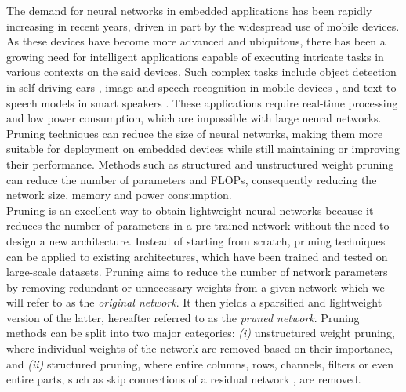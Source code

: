 The demand for neural networks in embedded applications has been rapidly
increasing in recent years, driven in part by the widespread use of mobile
devices. As these devices have become more advanced and ubiquitous, there has
been a growing need for intelligent applications capable of executing intricate
tasks in various contexts on the said devices. Such complex tasks include object
detection in self-driving cars
\cite{howard2017mobilenets,DBLP:conf/icml/TanL19,DBLP:conf/cvpr/RedmonDGF16,DBLP:conf/nips/RenHGS15,kuutti2020survey},
image and speech recognition in mobile devices
\cite{kim2020review,mcgraw2016personalized}, and text-to-speech models in smart
speakers \cite{arik2017deep,ren2019fastspeech}. These applications require
real-time processing and low power consumption, which are impossible with large
neural networks. Pruning techniques can reduce the size of neural networks,
making them more suitable for deployment on embedded devices while still
maintaining or improving their performance. Methods such as structured
\cite{DBLP:conf/iclr/0022KDSG17,DBLP:conf/iccv/LiuLSHYZ17} and unstructured
weight pruning
\cite{DBLP:conf/nips/CunDS89,DBLP:conf/iclr/FrankleC19,DBLP:conf/nips/HanPTD15}
can reduce the number of parameters and \acp{FLOP}, consequently reducing the
network size, memory and power consumption.\\

Pruning is an excellent way to obtain lightweight neural networks because it
reduces the number of parameters in a pre-trained network without the need to
design a new architecture. Instead of starting from scratch, pruning techniques
can be applied to existing architectures, which have been trained and tested on
large-scale datasets. Pruning aims to reduce the number of network parameters by
removing redundant or unnecessary weights from a given network which we will
refer to as the \textit{original network}. It then yields a sparsified and
lightweight version of the latter, hereafter referred to as the \textit{pruned
network}. Pruning methods can be split into two major categories: \textit{(i)}
unstructured weight pruning, where individual weights of the network are removed
based on their importance, and \textit{(ii)} structured pruning, where entire
columns, rows, channels, filters or even entire parts, such as skip connections
of a residual network \cite{DBLP:conf/cvpr/HeZRS16}, are removed. \\


